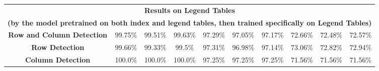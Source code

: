 \begin{table}[h!]
{\begin{tabular}{| c | c | c |c | c | c |c | c | c |c | }
 \hline
\multicolumn{10}{|c|}{\textbf{Results on Legend Tables}}\\
\multicolumn{10}{|c|}{\textbf{(by the model pretrained on both index and legend tables, then trained specifically on Legend Tables)}}\\
 \hline
 \textbf{Row and Column Detection} & 99.75\% & 99.51\% & 99.63\% & 97.29\% & 97.05\% & 97.17\% & 72.66\% & 72.48\% & 72.57\% \\
 \hline
 \textbf{Row Detection} & 99.66\% & 99.33\% & 99.5\% & 97.31\% & 96.98\% & 97.14\% & 73.06\% & 72.82\% & 72.94\% \\
 \hline
 \textbf{Column Detection} & 100.0\% & 100.0\% & 100.0\% & 97.25\% & 97.25\% & 97.25\% & 71.56\% & 71.56\% & 71.56\% \\
 \hline
\end{tabular}
}
\end{table}
